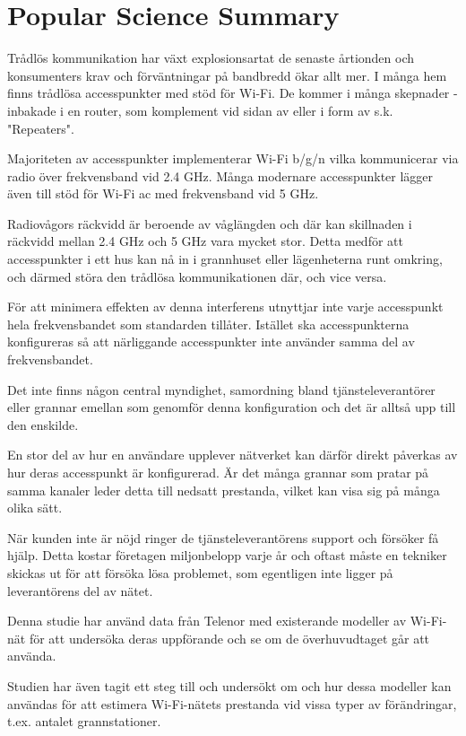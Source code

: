 \chapter*{Popular Science Summary}

Trådlös kommunikation har växt explosionsartat de senaste årtionden och
konsumenters krav och förväntningar på bandbredd ökar allt mer. I många hem
finns trådlösa accesspunkter med stöd för Wi-Fi. De kommer i många skepnader
- inbakade i en router, som komplement vid sidan av eller i form av s.k.
"Repeaters".

Majoriteten av accesspunkter implementerar Wi-Fi b/g/n vilka kommunicerar via
radio över frekvensband vid 2.4 GHz. Många modernare accesspunkter lägger även
till stöd för Wi-Fi ac med frekvensband vid 5 GHz.

Radiovågors räckvidd är beroende av våglängden och där kan skillnaden i räckvidd
mellan 2.4 GHz och 5 GHz vara mycket stor. Detta medför att accesspunkter i
ett hus kan nå in i grannhuset eller lägenheterna runt omkring, och därmed störa
den trådlösa kommunikationen där, och vice versa.

För att minimera effekten av denna interferens utnyttjar inte varje accesspunkt
hela frekvensbandet som standarden tillåter. Istället ska accesspunkterna
konfigureras så att närliggande accesspunkter inte använder samma del av
frekvensbandet.

Det inte finns någon central myndighet, samordning bland tjänsteleverantörer
eller grannar emellan som genomför denna konfiguration och det är alltså upp
till den enskilde.

En stor del av hur en användare upplever nätverket kan därför direkt påverkas av
hur deras accesspunkt är konfigurerad. Är det många grannar som pratar på samma
kanaler leder detta till nedsatt prestanda, vilket kan visa sig på många olika
sätt.

När kunden inte är nöjd ringer de tjänsteleverantörens support och försöker få
hjälp. Detta kostar företagen miljonbelopp varje år och oftast måste en tekniker
skickas ut för att försöka lösa problemet, som egentligen inte ligger på
leverantörens del av nätet.

Denna studie har använd data från Telenor med existerande modeller av Wi-Fi-nät
för att undersöka deras uppförande och se om de överhuvudtaget går att använda.

Studien har även tagit ett steg till och undersökt om och hur dessa modeller kan
användas för att estimera Wi-Fi-nätets prestanda vid vissa typer av
förändringar, t.ex. antalet grannstationer.
